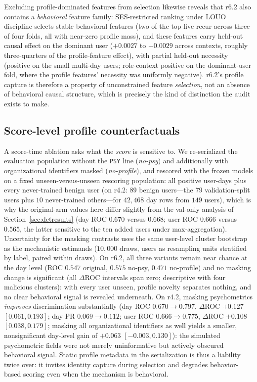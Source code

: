 \documentclass[10pt]{article} %
\newcommand{\rsix}{r6.2}
\newcommand{\rfour}{r4.2}
\begin{document}
Excluding profile-dominated features from selection likewise reveals that
\rsix{} also contains a \emph{behavioral} feature family: SES-restricted
ranking under LOUO discipline selects stable behavioral features (two of the
top five recur across three of four folds, all with near-zero profile mass),
and these features carry held-out causal effect on the dominant user
($+0.0027$ to $+0.0029$ across contexts, roughly three-quarters of the
profile-feature effect), with partial held-out necessity (positive on the
small multi-day users; role-context positive on the dominant-user fold, where
the profile features' necessity was uniformly negative). \rsix{}'s profile
capture is therefore a property of unconstrained feature \emph{selection},
not an absence of behavioral causal structure, which is precisely the kind
of distinction the audit exists to make.

\subsection{Score-level profile counterfactuals}
\label{sec:counterfactuals}

A score-time ablation asks what the \emph{score} is sensitive to. We re-serialized the
evaluation population without the \texttt{PSY} line (\emph{no-psy}) and
additionally with organizational identifiers masked (\emph{no-profile}), and
rescored with the frozen models on a fixed unseen-versus-unseen rescoring
population: all positive user-days plus every never-trained benign user
(on \rfour{}: $89$ benign users---the $79$ validation-split users plus $10$
never-trained others---for $42{,}468$ day rows from $149$ users), which is
why the original-arm values here differ slightly from the val-only analysis
of Section~\ref{sec:detresults} (day ROC $0.670$ versus $0.668$; user ROC
$0.666$ versus $0.565$, the latter sensitive to the ten added users under
max-aggregation). Uncertainty for the masking contrasts uses the same
user-level cluster bootstrap as the mechanistic estimands ($10{,}000$ draws,
users as resampling units stratified by label, paired within draws). On
\rsix{}, all three variants remain near chance at the day level (ROC $0.547$
original, $0.575$ no-psy, $0.471$ no-profile) and no masking change is
significant (all $\Delta$ROC intervals span zero; descriptive with four
malicious clusters): with every user unseen, profile novelty separates
nothing, and no clear behavioral signal is revealed underneath. On \rfour{}, masking
psychometrics \emph{improves} discrimination substantially (day ROC
$0.670\!\to\!0.797$, $\Delta$ROC $+0.127$ $[0.061, 0.193]$; day PR
$0.069\!\to\!0.112$; user ROC $0.666\!\to\!0.775$, $\Delta$ROC
$+0.108$ $[0.038, 0.179]$; masking all organizational identifiers as well
yields a smaller, nonsignificant day-level gain of $+0.063$
$[-0.003, 0.130]$): the simulated psychometric fields were not merely
uninformative but actively obscured behavioral signal. Static profile
metadata in the serialization is thus a liability twice over: it invites
identity capture during selection and degrades behavior-based scoring even
when the mechanism is behavioral.
\end{document}

